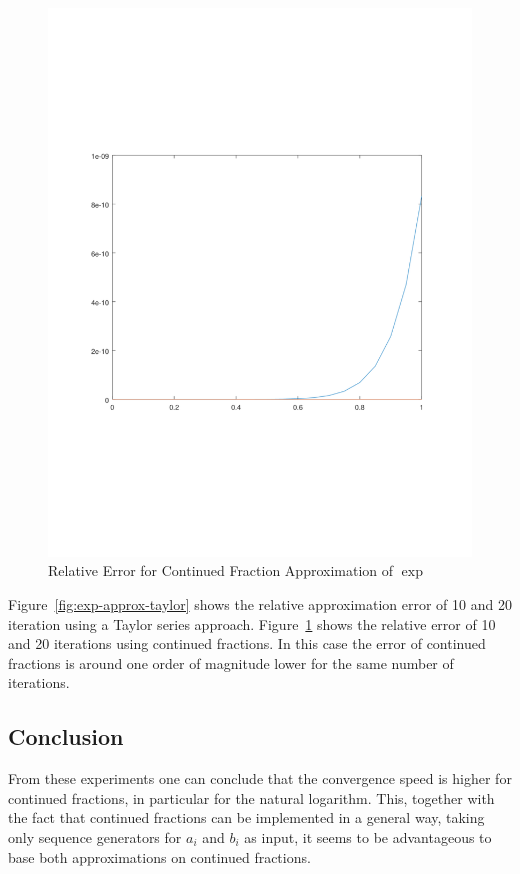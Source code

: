 \documentclass[11pt,a4paper,dvipsnames]{article}
\theoremstyle{definition}
\theoremstyle{definition}
\begin{document}
\begin{figure}[ht]
  \centering
    \includegraphics[width=\textwidth]{cf_exp}
  \caption{Relative Error for Continued Fraction Approximation of  $\exp$}
  \label{fig:exp-approx-cf}
\end{figure}

Figure~\ref{fig:exp-approx-taylor} shows the relative approximation error of 10
and 20 iteration using a Taylor series approach. Figure~\ref{fig:exp-approx-cf}
shows the relative error of 10 and 20 iterations using continued fractions. In
this case the error of continued fractions is around one order of magnitude
lower for the same number of iterations.

\subsection{Conclusion}
\label{sec:conclusion}

From these experiments one can conclude that the convergence speed is higher for
continued fractions, in particular for the natural logarithm. This, together
with the fact that continued fractions can be implemented in a general way,
taking only sequence generators for $a_{i}$ and $b_{i}$ as input, it seems to be
advantageous to base both approximations on continued fractions.
\end{document}
